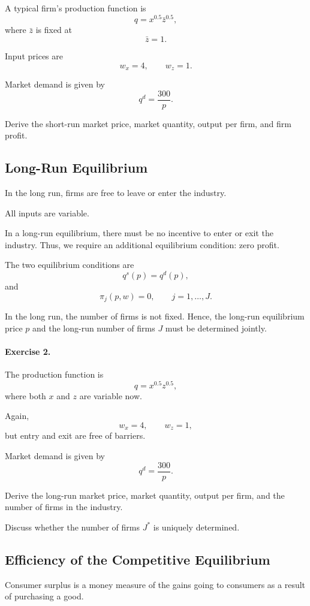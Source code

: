 A typical firm's production function is
\[
q=x^{0.5}\bar z^{0.5},
\]
where \(\bar z\) is fixed at
\[
\bar z=1.
\]

Input prices are
\[
w_x=4,
\qquad
w_z=1.
\]

Market demand is given by
\[
q^d=\frac{300}{p}.
\]

Derive the short-run market price, market quantity, output per firm, and firm profit.



\subsection{Long-Run Equilibrium}

In the long run, firms are free to leave or enter the industry.

All inputs are variable.

In a long-run equilibrium, there must be no incentive to enter or exit the industry. Thus, we require an additional equilibrium condition: zero profit.

The two equilibrium conditions are
\[
q^s(p)=q^d(p),
\]
and
\[
\pi_j(p,w)=0,
\qquad
j=1,\dots,J.
\]

In the long run, the number of firms is not fixed. Hence, the long-run equilibrium price \(p\) and the long-run number of firms \(J\) must be determined jointly.

\paragraph{Exercise 2.}
The production function is
\[
q=x^{0.5}z^{0.5},
\]
where both \(x\) and \(z\) are variable now.

Again,
\[
w_x=4,
\qquad
w_z=1,
\]
but entry and exit are free of barriers.

Market demand is given by
\[
q^d=\frac{300}{p}.
\]

Derive the long-run market price, market quantity, output per firm, and the number of firms in the industry.

Discuss whether the number of firms \(J^*\) is uniquely determined.

\subsection{Efficiency of the Competitive Equilibrium}

Consumer surplus is a money measure of the gains going to consumers as a result of purchasing a good.

